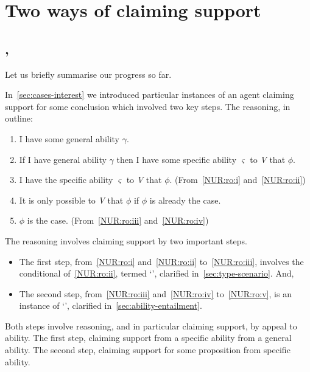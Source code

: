 \chapter{Two ways of claiming support}
\label{sec:two-ways-of-claiming-support}

\section{\adA{}, \adB{}}
\label{sec:ability-ads-adc}

\begin{note}
  Let us briefly summarise our progress so far.

  In~\autoref{sec:cases-interest} we introduced particular instances of an agent claiming support for some conclusion which involved two key steps.
  The reasoning, in outline:
  \begin{enumerate}[label=\arabic*., ref=(\arabic*)]
  \item\label{NUR:ro:i} I have some general ability \(\gamma\).
  \item\label{NUR:ro:ii} If I have general ability \(\gamma\) then I have some specific ability \(\varsigma\) to \emph{V} that \(\phi\).
  \item\label{NUR:ro:iii} I have the specific ability \(\varsigma\) to \emph{V} that \(\phi\). \hfill (From~\ref{NUR:ro:i} and~\ref{NUR:ro:ii})
  \item\label{NUR:ro:iv} It is only possible to \emph{V} that \(\phi\) if \(\phi\) is already the case.
  \item\label{NUR:ro:v} \(\phi\) is the case. \hfill (From~\ref{NUR:ro:iii} and~\ref{NUR:ro:iv})
  \end{enumerate}

  The reasoning involves claiming support by two important steps.

  \begin{itemize}
  \item The first step, from~\ref{NUR:ro:i} and~\ref{NUR:ro:ii} to~\ref{NUR:ro:iii}, involves the conditional of~\ref{NUR:ro:ii}, termed `\gsi{-}', clarified in~\autoref{sec:type-scenario}. And,
  \item The second step, from~\ref{NUR:ro:iii} and~\ref{NUR:ro:iv} to~\ref{NUR:ro:v}, is an instance of `', clarified in~\autoref{sec:ability-entailment}.
  \end{itemize}

  Both steps involve reasoning, and in particular claiming support, by appeal to ability.
  The first step, claiming support from a specific ability from a general ability.
  The second step, claiming support for some proposition from specific ability.


\end{note}
